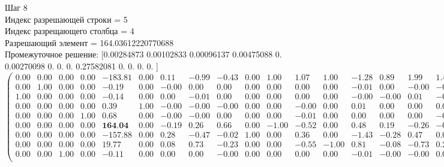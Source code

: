 \documentclass{article}
\begin{document}
\begin{flushleft}
    Шаг 8\\
Индекс разрешающей строки = 5\\
Индекс разрещающего столбца = 4\\
Разрешающий элемент = 164.03612220770688\\
Промежуточное решение:
 [0.00284873 0.00102833 0.00096137 0.00475088 0.         0.00270098
 0.         0.         0.         0.27582081 0.         0.
 0.         0.        ]
\begin{equation*}
\begin{pmatrix}
 0.00 & 0.00 & 0.00 & 0.00 & -183.81 & 0.00 &  0.11 & -0.99 & -0.43 & 0.00 &  1.00 &  1.07 &  1.00 & -1.28 &  0.89 &  1.99 &  1.43 &  1.00 & 0.00 & -0.07 & 0.00 &  2.28 & -0.49 \\
 0.00 & 1.00 & 0.00 & 0.00 &   -0.19 & 0.00 & -0.00 &  0.00 &  0.00 & 0.00 &  0.00 &  0.00 &  0.00 & -0.01 &  0.00 & -0.00 & -0.00 &  0.00 & 0.00 & -0.00 & 0.00 &  0.01 &  0.00 \\
 1.00 & 0.00 & 0.00 & 0.00 &   -0.14 & 0.00 &  0.00 & -0.01 &  0.00 & 0.00 &  0.00 &  0.00 &  0.00 & -0.00 & -0.00 &  0.01 & -0.00 &  0.00 & 0.00 & -0.00 & 0.00 &  0.00 &  0.00 \\
 0.00 & 0.00 & 0.00 & 0.00 &    0.39 & 1.00 & -0.00 & -0.00 & -0.00 & 0.00 &  0.00 & -0.00 &  0.00 &  0.01 &  0.00 &  0.00 &  0.00 &  0.00 & 0.00 &  0.00 & 0.00 & -0.01 &  0.00 \\
 0.00 & 0.00 & 0.00 & 1.00 &    0.68 & 0.00 & -0.00 & -0.00 &  0.00 & 0.00 &  0.00 & -0.01 &  0.00 &  0.00 &  0.00 &  0.00 & -0.00 &  0.00 & 0.00 &  0.01 & 0.00 & -0.00 &  0.00 \\
 0.00 & 0.00 & 0.00 & 0.00 &  \textbf{164.04} & 0.00 & -0.19 &  0.26 &  0.66 & 0.00 & -1.00 & -0.52 &  0.00 &  0.48 &  0.19 & -0.26 & -0.66 &  0.00 & 1.00 &  0.52 & 0.00 & -0.48 &  0.32 \\
 0.00 & 0.00 & 0.00 & 0.00 & -157.88 & 0.00 &  0.28 & -0.47 & -0.02 & 1.00 &  0.00 &  0.36 &  0.00 & -1.43 & -0.28 &  0.47 &  0.02 & -1.00 & 0.00 & -0.36 & 0.00 &  1.43 &  0.28 \\
 0.00 & 0.00 & 0.00 & 0.00 &   19.77 & 0.00 &  0.08 &  0.73 & -0.23 & 0.00 &  0.00 & -0.55 & -1.00 &  0.81 & -0.08 & -0.73 &  0.23 &  0.00 & 0.00 &  0.55 & 1.00 & -0.81 &  0.16 \\
 0.00 & 0.00 & 1.00 & 0.00 &   -0.11 & 0.00 &  0.00 &  0.00 & -0.00 & 0.00 &  0.00 &  0.00 &  0.00 & -0.01 & -0.00 & -0.00 &  0.00 &  0.00 & 0.00 & -0.00 & 0.00 &  0.01 &  0.00 \\
\end{pmatrix}
\end{equation*}
\end{flushleft}
\end{document}
